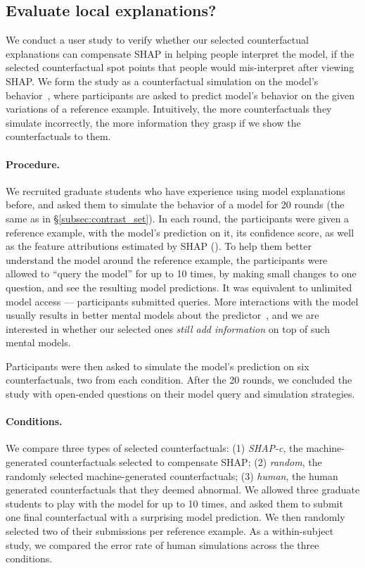 \subsection{Evaluate local explanations?}
We conduct a user study to verify whether our selected counterfactual explanations can compensate SHAP in helping people interpret the model, \ie if the selected counterfactual spot points that people would mis-interpret after viewing SHAP.
We form the study as a counterfactual simulation on the model's behavior~\cite{hase2020evaluating}, where participants are asked to predict model's behavior on the given variations of a reference example.
Intuitively, the more counterfactuals they simulate incorrectly, the more information they grasp if we show the counterfactuals to them.

\paragraph{Procedure.}
We recruited  graduate students who have experience using model explanations before, and asked them to simulate the behavior of a \qqp model for 20 rounds (the same as in \S\ref{subsec:contrast_set}).
In each round, the participants were given a reference example, with the model's prediction on it, its confidence score, as well as the feature attributions estimated by SHAP ().
To help them better understand the model around the reference example, the participants were allowed to ``query the model'' for up to 10 times, by making small changes to one question, and see the resulting model predictions.
It was equivalent to unlimited model access --- participants submitted  queries.
More interactions with the model usually results in better mental models about the predictor~\cite{miller}, and we are interested in whether our selected ones \emph{still add information} on top of such mental models.

Participants were then asked to simulate the model's prediction on six counterfactuals, two from each condition.
After the 20 rounds, we concluded the study with open-ended questions on their model query and simulation strategies.

\paragraph{Conditions.} 
We compare three types of selected counterfactuals:
(1) \emph{SHAP-c}, the machine-generated counterfactuals selected to compensate SHAP; 
(2) \emph{random}, the randomly selected machine-generated counterfactuals; 
(3) \emph{human}, 
the human generated counterfactuals that they deemed abnormal.
We allowed three graduate students to play with the model for up to 10 times, and asked them to submit one final counterfactual with a surprising model prediction.
We then randomly selected two of their submissions per reference example.
As a within-subject study, we compared the error rate of human simulations across the three conditions.


